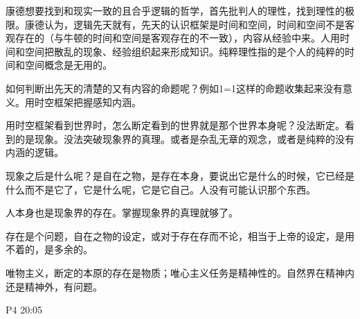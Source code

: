 康德想要找到和现实一致的且合乎逻辑的哲学，首先批判人的理性，找到理性的极限。康德认为，逻辑先天就有，先天的认识框架是时间和空间，时间和空间不是客观存在的（与牛顿的时间和空间是客观存在的不一致），内容从经验中来。人用时间和空间把散乱的现象、经验组织起来形成知识。纯粹理性指的是个人的纯粹的时间和空间概念是无用的。

如何判断出先天的清楚的又有内容的命题呢？例如1=1这样的命题收集起来没有意义。用时空框架把握感知内涵。

用时空框架看到世界时，怎么断定看到的世界就是那个世界本身呢？没法断定。看到的是现象。没法突破现象界的真理。或者是杂乱无章的观念，或者是纯粹的没有内涵的逻辑。

现象之后是什么呢？是自在之物，是存在本身，要说出它是什么的时候，它已经是什么而不是它了，它是什么呢，它是它自己。人没有可能认识那个东西。

人本身也是现象界的存在。掌握现象界的真理就够了。

存在是个问题，自在之物的设定，或对于存在存而不论，相当于上帝的设定，是用不着的，是多余的。


唯物主义，断定的本原的存在是物质；唯心主义任务是精神性的。自然界在精神内还是精神外，有问题。

P4 20:05

